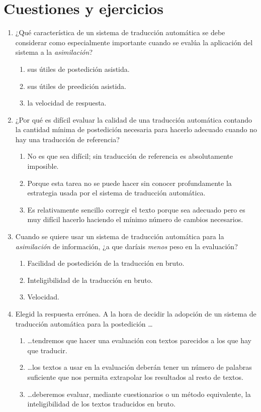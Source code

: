 \section{Cuestiones y ejercicios} 

\begin{enumerate} \item ¿Qué característica de un sistema de traducción automática se debe considerar como especialmente importante cuando se evalúa la aplicación del sistema a la \emph{asimilación}? \begin{enumerate} \item sus útiles de postedición asistida. \item sus útiles de preedición asistida. \item la velocidad de respuesta. \end{enumerate} 

\item ¿Por qué es difícil evaluar la calidad de una traducción automática contando la cantidad mínima de postedición necesaria para hacerlo adecuado cuando no hay una traducción de referencia? \begin{enumerate} \item No es que sea difícil; sin traducción de referencia es absolutamente imposible. \item Porque esta tarea no se puede hacer sin conocer profundamente la estrategia usada por el sistema de traducción automática. \item Es relativamente sencillo corregir el texto porque sea adecuado pero es muy difícil hacerlo haciendo el mínimo número de cambios necesarios. \end{enumerate} 

\item Cuando se quiere usar un sistema de traducción automática para la \emph{asimilación} de información, ¿a que daríais \emph{menos} peso en la evaluación? \begin{enumerate} \item Facilidad de postedición de la traducción en bruto. \item Inteligibilidad de la traducción en bruto. \item Velocidad. \end{enumerate} 

\item Elegid la respuesta errónea. A la hora de decidir la adopción de un sistema de traducción automática para la postedición \ldots\begin{enumerate} \item \ldots tendremos que hacer una evaluación con textos parecidos a los que hay que traducir. \item \ldots los textos a usar en la evaluación deberán tener un número de palabras suficiente que nos permita extrapolar los resultados al resto de textos. \item \ldots deberemos evaluar, mediante cuestionarios o un método equivalente, la inteligibilidad de los textos traducidos en bruto. \end{enumerate} 


\end{enumerate}
